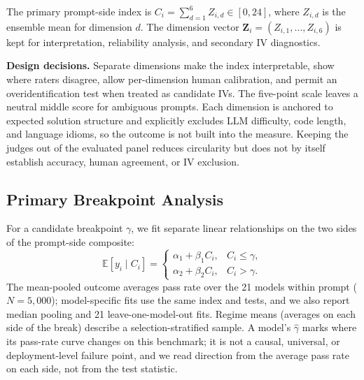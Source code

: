 \documentclass{article}
\begin{document}
The primary prompt-side index is $C_i = \sum_{d=1}^{6} Z_{i,d} \in [0,24]$, where $Z_{i,d}$ is the ensemble mean for dimension $d$. The dimension vector $\mathbf{Z}_i=(Z_{i,1},\ldots,Z_{i,6})$ is kept for interpretation, reliability analysis, and secondary IV diagnostics.

\textbf{Design decisions.} Separate dimensions make the index interpretable, show where raters disagree, allow per-dimension human calibration, and permit an overidentification test when treated as candidate IVs. The five-point scale leaves a neutral middle score for ambiguous prompts. Each dimension is anchored to expected solution structure and explicitly excludes LLM difficulty, code length, and language idioms, so the outcome is not built into the measure. Keeping the judges out of the evaluated panel reduces circularity but does not by itself establish accuracy, human agreement, or IV exclusion.

\subsection{Primary Breakpoint Analysis}
For a candidate breakpoint $\gamma$, we fit separate linear relationships on the two sides of the prompt-side composite:
\begin{equation}
\mathbb{E}[y_i\mid C_i] =
\begin{cases}
\alpha_1+\beta_1 C_i, & C_i\leq\gamma,\\
\alpha_2+\beta_2 C_i, & C_i>\gamma.
\end{cases}
\label{eq:threshold}
\end{equation}
The mean-pooled outcome averages pass rate over the 21 models within prompt ($N=5{,}000$); model-specific fits use the same index and tests, and we also report median pooling and 21 leave-one-model-out fits. Regime means (averages on each side of the break) describe a selection-stratified sample. A model's $\hat{\gamma}$ marks where its pass-rate curve changes on this benchmark; it is not a causal, universal, or deployment-level failure point, and we read direction from the average pass rate on each side, not from the test statistic.
\end{document}
